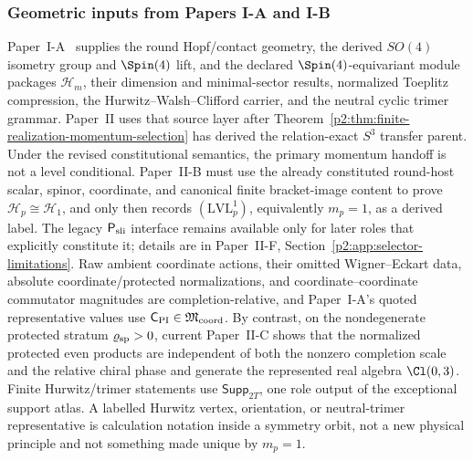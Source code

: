 \documentclass[12pt,a4paper]{article}
\begin{document}
\subsubsection{Geometric inputs from Papers I-A and I-B}

Paper~I-A~\cite{Kugelmann2026a} supplies the round Hopf/contact geometry, the
derived \(SO(4)\) isometry group and \(\Spin(4)\) lift, and the declared
\(\Spin(4)\)-equivariant module packages \(\mathcal H_m\), their dimension
and minimal-sector results, normalized Toeplitz compression, the
Hurwitz--Walsh--Clifford carrier, and the neutral cyclic trimer grammar.  Paper~II
uses that source layer after
Theorem~\ref{p2:thm:finite-realization-momentum-selection} has derived the
relation-exact \(S^3\) transfer parent.  Under the revised constitutional semantics, the primary momentum handoff is
not a level conditional.  Paper~II-B must use the already constituted round-host
scalar, spinor, coordinate, and canonical finite bracket-image content to prove
\(\mathcal H_p\cong\mathcal H_1\), and only then records
\((\mathrm{LVL}_p^1)\), equivalently \(m_p=1\), as a derived label.  The
legacy \(\mathsf P_{\rm sli}\) interface remains available only for later
roles that explicitly constitute it; details are in
Paper~II-F, Section~\ref{p2:app:selector-limitations}.  Raw ambient coordinate
actions, their omitted Wigner--Eckart data, absolute coordinate/protected
normalizations, and coordinate--coordinate commutator magnitudes are
completion-relative, and Paper~I-A's quoted representative values use
\(\mathsf C_{\rm PI}\in\mathfrak M_{\rm coord}\).  By contrast, on the
nondegenerate protected stratum \(\varrho_{\rm sp}>0\), current Paper~II-C
shows that the normalized protected even products are independent of both the
nonzero completion scale and the relative chiral phase and generate the
represented real algebra \(\Cl(0,3)\).  Finite Hurwitz/trimer
statements use \(\mathsf{Supp}_{2T}\), one role output of the exceptional
support atlas.  A labelled Hurwitz vertex, orientation, or neutral-trimer
representative is calculation notation inside a symmetry orbit, not a new
physical principle and not something made unique by \(m_p=1\).
\end{document}
